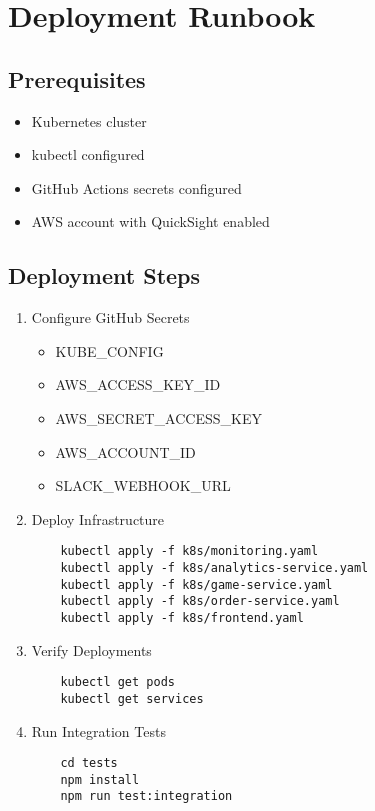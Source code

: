 \documentclass[12pt]{report}
\begin{document}
\chapter{Deployment Runbook}
\section{Prerequisites}
\begin{itemize}
    \item Kubernetes cluster
    \item kubectl configured
    \item GitHub Actions secrets configured
    \item AWS account with QuickSight enabled
\end{itemize}

\section{Deployment Steps}
\begin{enumerate}
    \item Configure GitHub Secrets
    \begin{itemize}
        \item KUBE\_CONFIG
        \item AWS\_ACCESS\_KEY\_ID
        \item AWS\_SECRET\_ACCESS\_KEY
        \item AWS\_ACCOUNT\_ID
        \item SLACK\_WEBHOOK\_URL
    \end{itemize}
    
    \item Deploy Infrastructure
    \begin{verbatim}
    kubectl apply -f k8s/monitoring.yaml
    kubectl apply -f k8s/analytics-service.yaml
    kubectl apply -f k8s/game-service.yaml
    kubectl apply -f k8s/order-service.yaml
    kubectl apply -f k8s/frontend.yaml
    \end{verbatim}
    
    \item Verify Deployments
    \begin{verbatim}
    kubectl get pods
    kubectl get services
    \end{verbatim}
    
    \item Run Integration Tests
    \begin{verbatim}
    cd tests
    npm install
    npm run test:integration
    \end{verbatim}
\end{enumerate}
\end{document}
